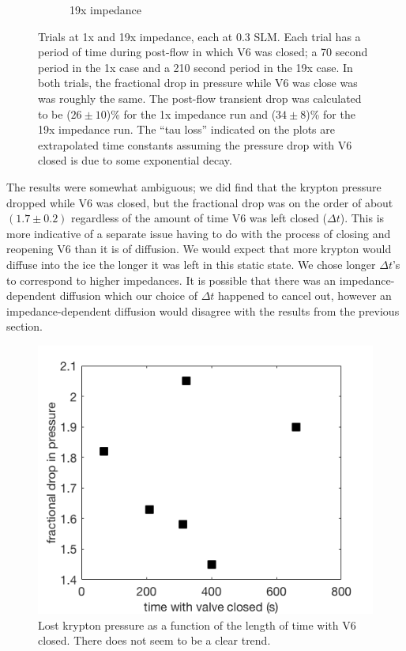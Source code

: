 \begin{figure}[h!]
\begin{subfigure}{0.5\textwidth}
  \caption{19x impedance}
  \label{fig:cyrano15x}
\end{subfigure}
\caption{Trials at 1x and 19x impedance, each at 0.3 SLM. Each trial has a period of time during post-flow in which V6 was closed; a 70 second period in the 1x case and a 210 second period in the 19x case. In both trials, the fractional drop in pressure while V6 was close was was roughly the same. The post-flow transient drop was calculated to be ($26\pm10$)\% for the 1x impedance run and ($34\pm8$)\% for the 19x impedance run. The ``tau loss'' indicated on the plots are extrapolated time constants assuming the pressure drop with V6 closed is due to some exponential decay.} 
\label{fig:cyrano_trace}
\end{figure}

The results were somewhat ambiguous; we did find that the krypton pressure dropped while V6 was closed, but the fractional drop was on the order of about $(1.7\pm0.2)$ regardless of the amount of time V6 was left closed ($\Delta t$). This is more indicative of a separate issue having to do with the process of closing and reopening V6 than it is of diffusion. We would expect that more krypton would diffuse into the ice the longer it was left in this static state. We chose longer $\Delta t$'s to correspond to higher impedances. It is possible that there was an impedance-dependent diffusion which our choice of $\Delta t$ happened to cancel out, however an impedance-dependent diffusion would disagree with the results from the previous section.
\begin{figure}[h!]
\centering
\includegraphics[width=\textwidth]{Figures/diffusion_pdrop.png}
\caption{Lost krypton pressure as a function of the length of time with V6 closed. There does not seem to be a clear trend. }
\label{fig:closed_drop}
\end{figure}

